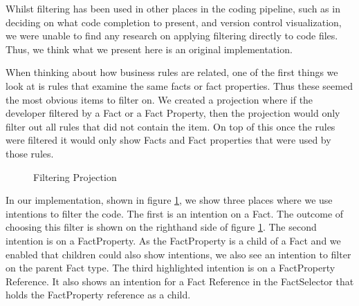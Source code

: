 Whilst filtering has been used in other places in the coding pipeline, such as in deciding on what code completion to present\cite{hou2010towards}, and version control visualization\cite{yoon2013visualization}, we were unable to find any research on applying filtering directly to code files.
Thus, we think what we present here is an original implementation.

When thinking about how business rules are related, one of the first things we look at is rules that examine the same facts or fact properties.
Thus these seemed the most obvious items to filter on.
We created a projection where if the developer filtered by a Fact or a Fact Property, then the projection would only filter out all rules that did not contain the item.
On top of this once the rules were filtered it would only show Facts and Fact properties that were used by those rules.

\begin{figure}[h]
    \centering
    \caption{Filtering Projection}
    \label{fig:filteringProjection}
\end{figure}

In our implementation, shown in figure \ref{fig:filteringProjection}, we show three places where we use intentions to filter the code.
The first is an intention on a Fact.
The outcome of choosing this filter is shown on the righthand side of figure \ref{fig:filteringProjection}.
The second intention is on a FactProperty.
As the FactProperty is a child of a Fact and we enabled that children could also show intentions, we also see an intention to filter on the parent Fact type.
The third highlighted intention is on a FactProperty Reference.
It also shows an intention for a Fact Reference in the FactSelector that holds the FactProperty reference as a child.

